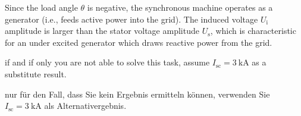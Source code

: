 
\begin{solutionblock}
    Since the load angle $\theta$ is negative, the synchronous machine operates as a generator (i.e., feeds active power into the grid). The induced voltage $U_\mathrm{i}$ amplitude is larger than the stator voltage amplitude $U_\mathrm{s}$, which is characteristic for an under excited generator which draws reactive power from the grid.
\end{solutionblock}


\begin{hintblock}
if and if only you are not able to solve this task, assume $I_\mathrm{sc} = \SI{3}{\kilo\ampere}$ as a substitute result.
\end{hintblock}
\begin{germanhintblock}
nur für den Fall, dass Sie kein Ergebnis ermitteln können, verwenden Sie $I_\mathrm{sc} = \SI{3}{\kilo\ampere}$ als Alternativergebnis.
\end{germanhintblock}

